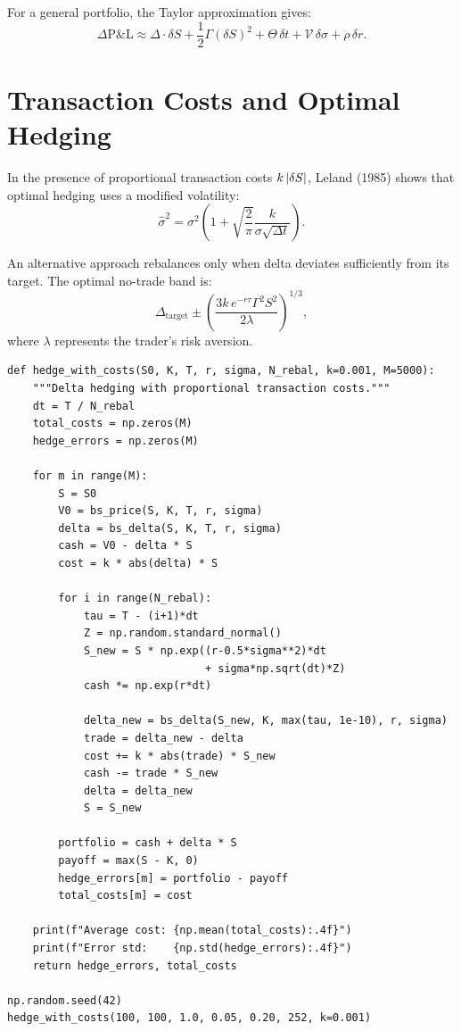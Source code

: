 \begin{keyformulas}[title=\textbf{Taylor Approximation of P\&L}]
For a general portfolio, the Taylor approximation gives:
\[
    \Delta\text{P\&L} \approx \Delta\cdot\delta S
    + \frac{1}{2}\Gamma(\delta S)^2 + \Theta\,\delta t
    + \mathcal{V}\,\delta\sigma + \rho\,\delta r.
\]
\end{keyformulas}

\section{Transaction Costs and Optimal Hedging}

\begin{theorem}
In the presence of proportional transaction costs $k\left| \delta S \right|$,
Leland (1985) shows that optimal hedging uses a modified volatility:
\[
    \hat{\sigma}^2 = \sigma^2\left(1 + \sqrt{\frac{2}{\pi}}
    \frac{k}{\sigma\sqrt{\Delta t}}\right).
\]
\end{theorem}

\begin{proposition}
An alternative approach rebalances only when delta deviates sufficiently
from its target. The optimal no-trade band is:
\[
    \Delta_{\text{target}} \pm \left(\frac{3k\,e^{-r\tau}\Gamma^2 S^2}
    {2\lambda}\right)^{1/3},
\]
where $\lambda$ represents the trader's risk aversion.
\end{proposition}

\begin{codeblock}[title=\textbf{Hedging with Transaction Costs}]
\begin{verbatim}
def hedge_with_costs(S0, K, T, r, sigma, N_rebal, k=0.001, M=5000):
    """Delta hedging with proportional transaction costs."""
    dt = T / N_rebal
    total_costs = np.zeros(M)
    hedge_errors = np.zeros(M)

    for m in range(M):
        S = S0
        V0 = bs_price(S, K, T, r, sigma)
        delta = bs_delta(S, K, T, r, sigma)
        cash = V0 - delta * S
        cost = k * abs(delta) * S

        for i in range(N_rebal):
            tau = T - (i+1)*dt
            Z = np.random.standard_normal()
            S_new = S * np.exp((r-0.5*sigma**2)*dt
                               + sigma*np.sqrt(dt)*Z)
            cash *= np.exp(r*dt)

            delta_new = bs_delta(S_new, K, max(tau, 1e-10), r, sigma)
            trade = delta_new - delta
            cost += k * abs(trade) * S_new
            cash -= trade * S_new
            delta = delta_new
            S = S_new

        portfolio = cash + delta * S
        payoff = max(S - K, 0)
        hedge_errors[m] = portfolio - payoff
        total_costs[m] = cost

    print(f"Average cost: {np.mean(total_costs):.4f}")
    print(f"Error std:    {np.std(hedge_errors):.4f}")
    return hedge_errors, total_costs

np.random.seed(42)
hedge_with_costs(100, 100, 1.0, 0.05, 0.20, 252, k=0.001)
\end{verbatim}
\end{codeblock}

